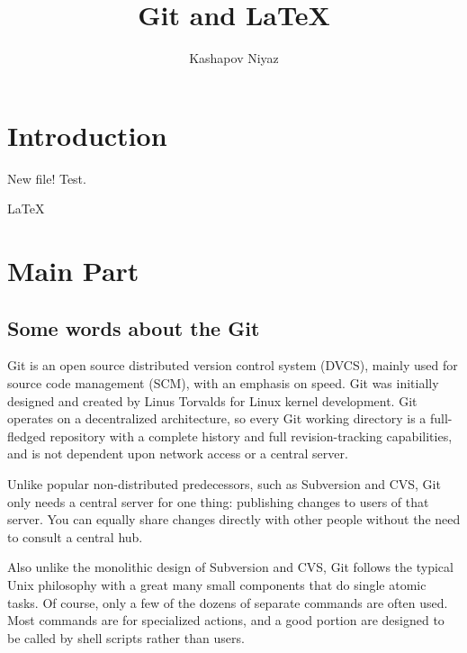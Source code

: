 \documentclass[12pt]{article}
\title{\textbf{ Git and \LaTeX{}}}
\author{Kashapov Niyaz}
\date{}
\begin{document}
\maketitle

\tableofcontents

\section{Introduction}
\par New file! Test.
\par \LaTeX{}  

\section{Main Part}

\subsection{Some words about the Git}
\label{seg:part1}
\par Git is an open source distributed version control system (DVCS), mainly used for source code management (SCM), with an emphasis on speed. Git was initially designed and created by Linus Torvalds for Linux kernel development. Git operates on a decentralized architecture, so every Git working directory is a full-fledged repository with a complete history and full revision-tracking capabilities, and is not dependent upon network access or a central server.

\par Unlike popular non-distributed predecessors, such as Subversion and CVS, Git only needs a central server for one thing: publishing changes to users of that server. You can equally share changes directly with other people without the need to consult a central hub.

\par Also unlike the monolithic design of Subversion and CVS, Git follows the typical Unix philosophy with a great many small components that do single atomic tasks. Of course, only a few of the dozens of separate commands are often used. Most commands are for specialized actions, and a good portion are designed to be called by shell scripts rather than users.
\cite{gitbook}
\end{document}
